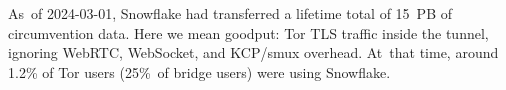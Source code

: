 \documentclass[letterpaper,twocolumn]{article}
\begin{document}
As~of \mbox{2024-03-01},
Snowflake had transferred a lifetime total of 15~PB of circumvention data.
Here we mean goodput: Tor TLS traffic inside the tunnel,
ignoring WebRTC, WebSocket, and KCP/\allowbreak smux overhead.
At~that time, around 1.2\% of Tor users
(25\%~of bridge users) were using Snowflake.
\end{document}
